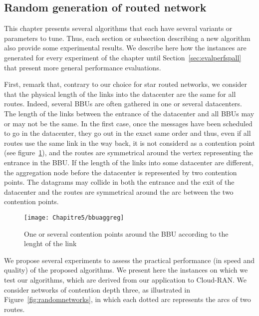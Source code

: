 \subsection{Random generation of routed network}
\label{sec:generationrouted}
This chapter presents several algorithms that each have several variants or parameters to tune. Thus, each section or subsection describing a new algorithm also provide some experimental results. We describe here how the instances are generated for every experiment of the chapter until Section~\ref{sec:evalperfspall} that present more general performance evaluations.

First, remark that, contrary to our choice for star routed networks, we consider that the physical length of the links into the datacenter are the same for all routes. Indeed, several BBUs are often gathered in one or several datacenters. The length of the links between the entrance of the datacenter and all BBUs may or may not be the same. In the first case, once the messages have been scheduled to go in the datacenter, they go out in the exact same order and thus, even if all routes use the same link in the way back, it is not considerd as a contention point (see figure~\ref{fig:bbuaggreg}), and the routes are symmetrical around the vertex representing the entrance in the BBU. If the length of the links into some datacenter are different, the aggregation node before the datacenter is represented by two contention points. The datagrams may collide in both the entrance and the exit of the datacenter and the routes are symmetrical around the arc between the two contention points.

    \begin{figure}

  \centering
  \texttt{[image: Chapitre5/bbuaggreg]}


\caption{One or several contention points around the BBU according to the lenght of the link}
\label{fig:bbuaggreg}
\end{figure}

We propose several experiments to assess the practical performance (in speed and quality) of the proposed algorithms. We present here the instances on which we test our algorithms, which are derived from our application to Cloud-RAN. We consider networks of contention depth three, as illustrated in Figure~\ref{fig:randomnetworks}, in which each dotted arc represents the arcs of two routes. 



